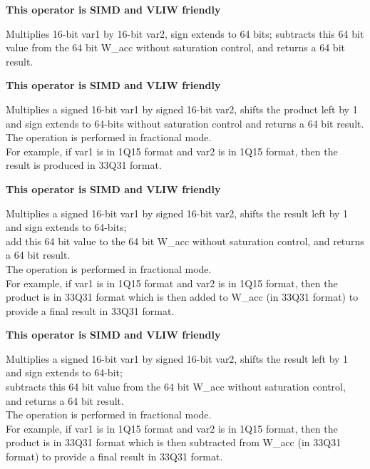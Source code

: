 \textbf{ This operator is SIMD and VLIW friendly}

Multiplies 16-bit var1 by 16-bit var2, sign extends to 64 bits; subtracts this 64 bit value from the 64 bit W\_acc without saturation control, and returns a 64 bit result.


\textbf{ This operator is SIMD and VLIW friendly}

Multiplies a signed 16-bit var1 by signed 16-bit var2, shifts the product left by 1 and sign extends to 64-bits without saturation control and returns a 64 bit result.\\
The operation is performed in fractional mode.\\
For example, if var1 is in 1Q15 format and var2 is in 1Q15 format, then the result is produced in 33Q31 format.


\textbf{ This operator is SIMD and VLIW friendly}

Multiplies a signed 16-bit var1 by signed 16-bit var2, shifts the result left by 1 and sign extends to 64-bits;\\
add this 64 bit value to the 64 bit W\_acc without saturation control, and returns a 64 bit result.\\
The operation is performed in fractional mode.\\
For example, if var1 is in 1Q15 format and var2 is in 1Q15 format, then the product is in 33Q31 format which is then added to W\_acc (in 33Q31 format) to provide a final result in 33Q31 format.


\textbf{ This operator is SIMD and VLIW friendly}

Multiplies a signed 16-bit var1 by signed 16-bit var2, shifts the result left by 1 and sign extends to 64-bit;\\
subtracts this 64 bit value from the 64 bit W\_acc without saturation control, and returns a 64 bit result.\\
The operation is performed in fractional mode.\\
For example, if var1 is in 1Q15 format and var2 is in 1Q15 format, then the product is in 33Q31 format which is then subtracted from W\_acc (in 33Q31 format) to provide a final result in 33Q31 format.

